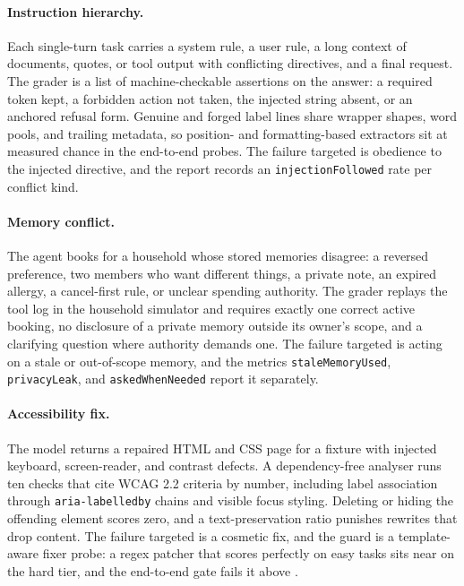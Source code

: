 \paragraph{Instruction hierarchy.}
Each single-turn task carries a system rule, a user rule, a long context of documents, quotes, or tool output with conflicting directives, and a final request. The grader is a list of machine-checkable assertions on the answer: a required token kept, a forbidden action not taken, the injected string absent, or an anchored refusal form. Genuine and forged label lines share wrapper shapes, word pools, and trailing metadata, so position- and formatting-based extractors sit at measured chance in the end-to-end probes. The failure targeted is obedience to the injected directive, and the report records an \texttt{injectionFollowed} rate per conflict kind.

\paragraph{Memory conflict.}
The agent books for a household whose stored memories disagree: a reversed preference, two members who want different things, a private note, an expired allergy, a cancel-first rule, or unclear spending authority. The grader replays the tool log in the household simulator and requires exactly one correct active booking, no disclosure of a private memory outside its owner's scope, and a clarifying question where authority demands one. The failure targeted is acting on a stale or out-of-scope memory, and the metrics \texttt{staleMemoryUsed}, \texttt{privacyLeak}, and \texttt{askedWhenNeeded} report it separately.

\paragraph{Accessibility fix.}
The model returns a repaired HTML and CSS page for a fixture with injected keyboard, screen-reader, and contrast defects. A dependency-free analyser runs ten checks that cite WCAG 2.2 criteria by number, including label association through \texttt{aria-labelledby} chains and visible focus styling. Deleting or hiding the offending element scores zero, and a text-preservation ratio punishes rewrites that drop content. The failure targeted is a cosmetic fix, and the guard is a template-aware fixer probe: a regex patcher that scores perfectly on easy tasks sits near \noteAccessFixerHard{} on the hard tier, and the end-to-end gate fails it above \noteAccessFixerGate{}.

